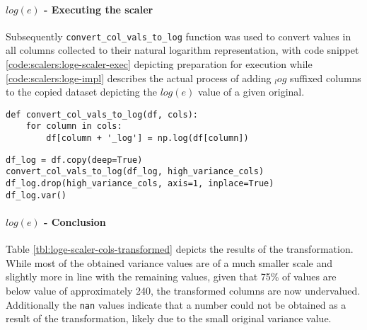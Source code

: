 \paragraph{$log(e)$ - Executing the scaler}
Subsequently \texttt{convert\_col\_vals\_to\_log} function was used to convert values in all columns collected to their natural logarithm representation, with code snippet \ref{code:scalers:loge-scaler-exec} depicting preparation for execution while \ref{code:scalers:loge-impl} describes the actual process of adding $_log$ suffixed columns to the copied dataset depicting the $log(e)$ value of a given original. 

\begin{code}
\label{code:scalers:loge-impl}
\begin{verbatim}
def convert_col_vals_to_log(df, cols):
    for column in cols:
        df[column + '_log'] = np.log(df[column])
\end{verbatim}
\end{code}

\begin{code}
\label{code:scalers:loge-scaler-exec}
\begin{verbatim}
df_log = df.copy(deep=True)
convert_col_vals_to_log(df_log, high_variance_cols)
df_log.drop(high_variance_cols, axis=1, inplace=True)
df_log.var()
\end{verbatim}
\end{code}

\paragraph{$log(e)$ - Conclusion}
Table \ref{tbl:loge-scaler-cols-transformed} depicts the results of the transformation. While most of the obtained variance values are of a much smaller scale and slightly more in line with the remaining values, given that 75\% of values are below value of approximately 240, the transformed columns are now undervalued. 
Additionally the \texttt{nan} values indicate that a number could not be obtained as a result of the transformation, likely due to the small original variance value. 

